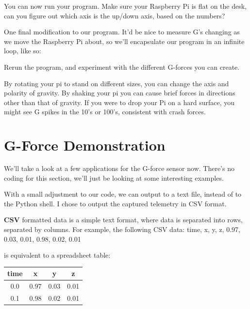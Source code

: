 	You can now run your program. Make sure your Raspberry Pi is flat on the desk, can you figure out which axis is the up/down axis, based on the numbers?
	
	One final modification to our program. It'd be nice to measure G's changing as we move the Raspberry Pi about, so we'll encapsulate our program in an infinite loop, like so:
	
	
	
	Rerun the program, and experiment with the different G-forces you can create.
	
	By rotating your pi to stand on different sizes, you can change the axis and polarity of gravity. By shaking your pi you can cause brief forces in directions
	other than that of gravity. If you were to drop your Pi on a hard surface, you might see G spikes in the 10's or 100's, consistent with crash forces.
	
	\webclearpage
	\section{G-Force Demonstration}
	
	We'll take a look at a few applications for the G-force sensor now. There's no coding for this section, we'll just be looking at some interesting examples.
	
	With a small adjustment to our code, we can output to a text file, instead of to the Python shell. I chose to output the captured telemetry in CSV format.
	
	\begin{aside}
		\textbf{CSV} formatted data is a simple text format, where data is separated into rows, separated by columns. For example, the following CSV data:
		\color{Black}
		\newline time, x, y, z, 0.97, 0.03, 0.01, 0.98, 0.02, 0.01
		\color{JungleGreen}
		
		is equivalent to a spreadsheet table:
		\color{Black}
		\begin{tabular}{|c|c|c|c|}
			\hline time & x & y & z \\ 
			\hline 0.0 & 0.97 & 0.03 & 0.01 \\ 
			\hline 0.1 & 0.98 & 0.02 & 0.01 \\ 
			\hline 
		\end{tabular}
	\end{aside}
	
